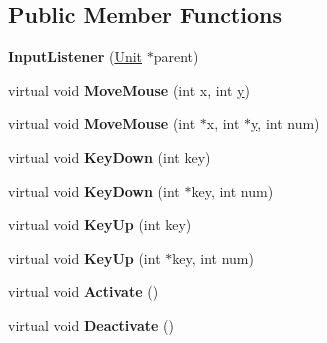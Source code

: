 \subsection*{Public Member Functions}
\begin{DoxyCompactItemize}
\item 
{\bfseries Input\+Listener} (\hyperlink{classUnit}{Unit} $\ast$parent)\hypertarget{classInputListener_ac0a3a9d801714538ee2bf144753b1b16}{}\label{classInputListener_ac0a3a9d801714538ee2bf144753b1b16}

\item 
virtual void {\bfseries Move\+Mouse} (int x, int \hyperlink{IceUtils_8h_aa7ffaed69623192258fb8679569ff9ba}{y})\hypertarget{classInputListener_ac67087cadc24c9df598b1051df039f86}{}\label{classInputListener_ac67087cadc24c9df598b1051df039f86}

\item 
virtual void {\bfseries Move\+Mouse} (int $\ast$x, int $\ast$\hyperlink{IceUtils_8h_aa7ffaed69623192258fb8679569ff9ba}{y}, int num)\hypertarget{classInputListener_a98628e628d49129f9e078e9cf6c473c5}{}\label{classInputListener_a98628e628d49129f9e078e9cf6c473c5}

\item 
virtual void {\bfseries Key\+Down} (int key)\hypertarget{classInputListener_a9ae559522c44dbc59d73070548eac497}{}\label{classInputListener_a9ae559522c44dbc59d73070548eac497}

\item 
virtual void {\bfseries Key\+Down} (int $\ast$key, int num)\hypertarget{classInputListener_a2784a2dde14ad84de33c456fcb47fbcf}{}\label{classInputListener_a2784a2dde14ad84de33c456fcb47fbcf}

\item 
virtual void {\bfseries Key\+Up} (int key)\hypertarget{classInputListener_ab3e08d248656a80786c5e9f3b7ceb9d0}{}\label{classInputListener_ab3e08d248656a80786c5e9f3b7ceb9d0}

\item 
virtual void {\bfseries Key\+Up} (int $\ast$key, int num)\hypertarget{classInputListener_a588358a52e3f33528bbab330d7a81f2e}{}\label{classInputListener_a588358a52e3f33528bbab330d7a81f2e}

\item 
virtual void {\bfseries Activate} ()\hypertarget{classInputListener_a0db1bb4ebcbdfdf10fc113eb908d33f3}{}\label{classInputListener_a0db1bb4ebcbdfdf10fc113eb908d33f3}

\item 
virtual void {\bfseries Deactivate} ()\hypertarget{classInputListener_ad457fee4b95ca766eec79132b9b3bcd4}{}\label{classInputListener_ad457fee4b95ca766eec79132b9b3bcd4}

\end{DoxyCompactItemize}
